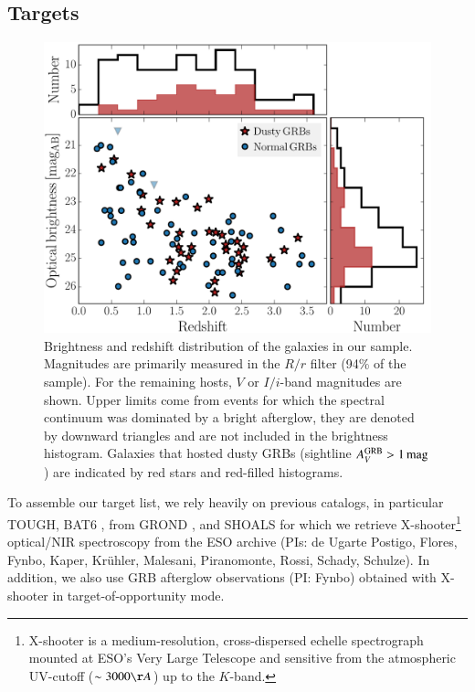 \documentclass[traditabstract, longauth]{aa}
\begin{document}
\subsection{Targets}
\label{sec:tarob}

\begin{figure}
\includegraphics[angle=0, width=0.99\columnwidth]{Figs/Brightness.pdf}
\caption{Brightness and redshift distribution of the galaxies in our sample. Magnitudes are primarily measured in the $R/r$ filter (94\% of the sample). For the remaining hosts, $V$ or $I/i$-band magnitudes are shown. {Upper limits come from events for which the spectral continuum was dominated by a bright afterglow, they are denoted by downward triangles and are not included in the brightness histogram. Galaxies that hosted dusty GRBs (sightline $A^{\rm{GRB}}_V>1\,\rm{mag}$) are indicated by red stars and red-filled histograms.}}
\label{fig:brightness}
\end{figure}

 {To assemble our target list, we rely heavily on previous catalogs, in particular TOUGH, BAT6 \citep{2012ApJ...749...68S}, from GROND \citep{2011A&A...526A..30G, 2011A&A...534A.108K}, and SHOALS} for which we retrieve X-shooter\footnote{X-shooter is a medium-resolution, cross-dispersed echelle spectrograph mounted at ESO's Very Large Telescope and sensitive from the atmospheric UV-cutoff ($\sim 3000\AA$) up to the $K$-band.} \citep{2011A&A...536A.105V} optical/NIR spectroscopy from the ESO archive (PIs: de Ugarte Postigo, Flores, Fynbo, Kaper, Kr\"uhler, Malesani, Piranomonte, Rossi, Schady, Schulze). In addition, we also use GRB afterglow observations (PI: Fynbo) obtained with X-shooter in target-of-opportunity mode. 
\end{document}
